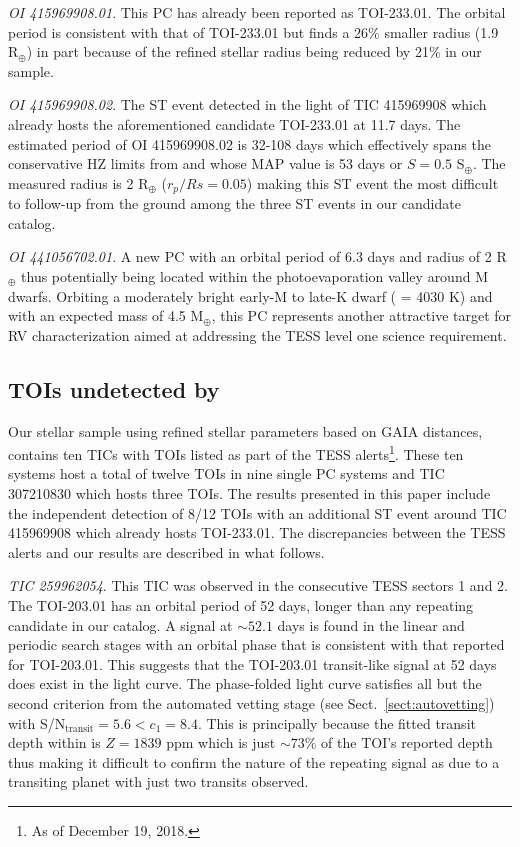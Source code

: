 \emph{OI 415969908.01}. This PC has already been reported as TOI-233.01. The \pipeline{} orbital
period is consistent with that of TOI-233.01 but finds a 26\% smaller radius (1.9 R$_{\oplus}$)
in part because of the refined stellar radius being reduced by 21\% in our sample.

\emph{OI 415969908.02}. The ST event detected in the light of TIC 415969908 which already
hosts the aforementioned candidate TOI-233.01 at 11.7 days. The estimated period of OI 415969908.02 is 32-108 days
which effectively spans the conservative HZ limits from \cite{kopparapu13} and whose MAP value is
53 days or $S=0.5$ S$_{\oplus}$. The measured radius is 2 R$_{\oplus}$ ($r_p/Rs=0.05$) making this
ST event the most difficult to follow-up from the ground among the three ST events in our candidate
catalog.

\emph{OI 441056702.01}. A new PC with an orbital period of 6.3 days and radius of 2 R$_{\oplus}$
thus potentially being located within the photoevaporation valley around M dwarfs. Orbiting a moderately bright
early-M to late-K dwarf (\teff{} = 4030 K) and with an expected mass of 4.5 M$_{\oplus}$, this PC
represents another attractive target for RV characterization aimed at addressing the TESS level
one science requirement. 


\subsection{TOIs undetected by \pipeline{}} \label{sect:undet}
Our stellar sample using refined stellar parameters based on GAIA distances,
contains ten TICs with TOIs listed as part of the TESS alerts\footnote{As of December 19, 2018.}.
These ten systems host a total of twelve TOIs in nine single PC systems
and TIC 307210830 which hosts three TOIs. The \pipeline{} results presented in this paper
include the independent detection of 8/12 TOIs with an additional ST event around TIC 415969908 which
already hosts TOI-233.01. The discrepancies between the TESS alerts and our \pipeline{} results
are described in what follows.

\emph{TIC 259962054}. This TIC was observed in the consecutive TESS sectors 1 and 2.
The TOI-203.01 has an orbital period of 52 days, longer than any repeating
candidate in our catalog. A signal at $\sim 52.1$ days is found in the \pipeline{} linear and
periodic search stages with an orbital phase that is consistent with that reported for TOI-203.01.
This suggests that the TOI-203.01 transit-like signal at 52 days does exist in the light curve.
The phase-folded light curve satisfies all but the second criterion from the automated vetting
stage (see Sect.~\ref{sect:autovetting}) with S/N$_{\text{transit}}=5.6<c_1=8.4$. This is principally
because the fitted transit depth within \pipeline{} is $Z=1839$ ppm  which is just
$\sim 73$\% of the TOI's reported depth thus making it difficult to confirm the nature of the
repeating signal as due to a transiting planet with just two transits observed.


